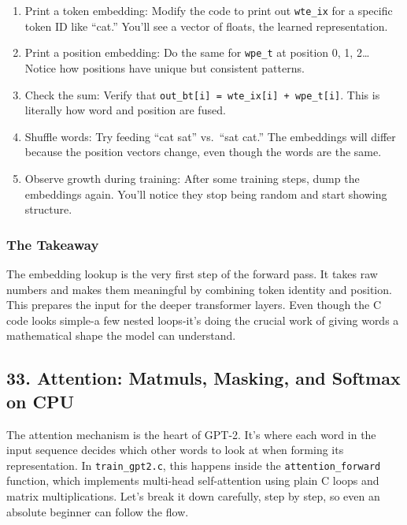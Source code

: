\documentclass[
  letterpaper,
  DIV=11,
  numbers=noendperiod]{scrreprt}
\providecommand{\tightlist}{%
  \setlength{\itemsep}{0pt}\setlength{\parskip}{0pt}}
\begin{document}
\begin{enumerate}
\def\labelenumi{\arabic{enumi}.}
\tightlist
\item
  Print a token embedding: Modify the code to print out \texttt{wte\_ix}
  for a specific token ID like ``cat.'' You'll see a vector of floats,
  the learned representation.
\item
  Print a position embedding: Do the same for \texttt{wpe\_t} at
  position 0, 1, 2\ldots{} Notice how positions have unique but
  consistent patterns.
\item
  Check the sum: Verify that
  \texttt{out\_bt{[}i{]}\ =\ wte\_ix{[}i{]}\ +\ wpe\_t{[}i{]}}. This is
  literally how word and position are fused.
\item
  Shuffle words: Try feeding ``cat sat'' vs.~``sat cat.'' The embeddings
  will differ because the position vectors change, even though the words
  are the same.
\item
  Observe growth during training: After some training steps, dump the
  embeddings again. You'll notice they stop being random and start
  showing structure.
\end{enumerate}

\subsubsection{The Takeaway}\label{the-takeaway-21}

The embedding lookup is the very first step of the forward pass. It
takes raw numbers and makes them meaningful by combining token identity
and position. This prepares the input for the deeper transformer layers.
Even though the C code looks simple-a few nested loops-it's doing the
crucial work of giving words a mathematical shape the model can
understand.

\subsection{33. Attention: Matmuls, Masking, and Softmax on
CPU}\label{attention-matmuls-masking-and-softmax-on-cpu}

The attention mechanism is the heart of GPT-2. It's where each word in
the input sequence decides which other words to look at when forming its
representation. In \texttt{train\_gpt2.c}, this happens inside the
\texttt{attention\_forward} function, which implements multi-head
self-attention using plain C loops and matrix multiplications. Let's
break it down carefully, step by step, so even an absolute beginner can
follow the flow.
\end{document}
